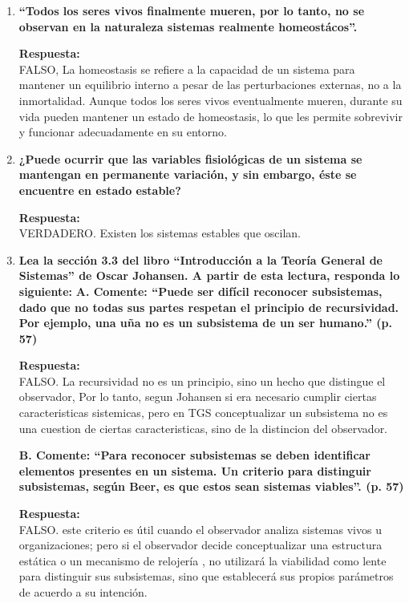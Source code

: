 \documentclass[12pt,a4paper]{article}
\begin{document}
\begin{enumerate}[label=\textbf{Pregunta \arabic*.}]
    \item \textbf{“Todos los seres vivos finalmente mueren, por lo tanto, no se observan
              en la naturaleza sistemas realmente homeostácos”.}

          \textbf{Respuesta:} \\
          FALSO, La homeostasis se refiere a la capacidad de un sistema para mantener un equilibrio interno a pesar de las perturbaciones externas, no a la inmortalidad.
          Aunque todos los seres vivos eventualmente mueren, durante su vida pueden mantener un estado de homeostasis, lo que les permite sobrevivir y funcionar adecuadamente en su entorno.


    \item \textbf{¿Puede ocurrir que las variables fisiológicas de un sistema se mantengan
              en permanente variación, y sin embargo, éste se encuentre en estado
              estable?}

          \textbf{Respuesta:} \\
          VERDADERO. Existen los sistemas estables que oscilan.

    \item \textbf{Lea la sección 3.3 del libro “Introducción a la Teoría General de
              Sistemas” de Oscar Johansen. A partir de esta lectura, responda lo
              siguiente:}
          \subitem \textbf{A. Comente: “Puede ser difícil reconocer subsistemas, dado que no
              todas sus partes respetan el principio de recursividad. Por ejemplo,
              una uña no es un subsistema de un ser humano.” (p. 57)}

          \textbf{Respuesta:} \\
          FALSO. La recursividad no es un principio, sino un hecho que distingue el observador,
          Por lo tanto, segun Johansen si era necesario cumplir ciertas caracteristicas sistemicas,
          pero en TGS conceptualizar un subsistema no es una cuestion de ciertas caracteristicas, sino de la distincion del observador.

          \subitem \textbf{B. Comente: “Para reconocer subsistemas se deben identificar
              elementos presentes en un sistema. Un criterio para distinguir
              subsistemas, según Beer, es que estos sean sistemas viables”. (p.
              57)}

          \textbf{Respuesta:} \\
          FALSO. este criterio es útil cuando el observador analiza sistemas vivos u organizaciones; pero si el observador decide conceptualizar una estructura estática o un mecanismo de relojería
          , no utilizará la viabilidad como lente para distinguir sus subsistemas, sino que establecerá sus propios parámetros de acuerdo a su intención.


\end{enumerate}
\end{document}
